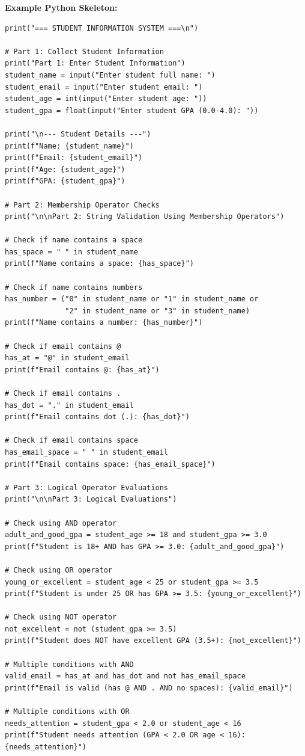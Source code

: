 \documentclass[a4paper,11pt]{article}
\theoremstyle{mytheor}
\begin{document}
    \textbf{Example Python Skeleton:}
    \begin{lstlisting}
print("=== STUDENT INFORMATION SYSTEM ===\n")

# Part 1: Collect Student Information
print("Part 1: Enter Student Information")
student_name = input("Enter student full name: ")
student_email = input("Enter student email: ")
student_age = int(input("Enter student age: "))
student_gpa = float(input("Enter student GPA (0.0-4.0): "))

print("\n--- Student Details ---")
print(f"Name: {student_name}")
print(f"Email: {student_email}")
print(f"Age: {student_age}")
print(f"GPA: {student_gpa}")

# Part 2: Membership Operator Checks
print("\n\nPart 2: String Validation Using Membership Operators")

# Check if name contains a space
has_space = " " in student_name
print(f"Name contains a space: {has_space}")

# Check if name contains numbers
has_number = ("0" in student_name or "1" in student_name or 
              "2" in student_name or "3" in student_name)
print(f"Name contains a number: {has_number}")

# Check if email contains @
has_at = "@" in student_email
print(f"Email contains @: {has_at}")

# Check if email contains .
has_dot = "." in student_email
print(f"Email contains dot (.): {has_dot}")

# Check if email contains space
has_email_space = " " in student_email
print(f"Email contains space: {has_email_space}")

# Part 3: Logical Operator Evaluations
print("\n\nPart 3: Logical Evaluations")

# Check using AND operator
adult_and_good_gpa = student_age >= 18 and student_gpa >= 3.0
print(f"Student is 18+ AND has GPA >= 3.0: {adult_and_good_gpa}")

# Check using OR operator
young_or_excellent = student_age < 25 or student_gpa >= 3.5
print(f"Student is under 25 OR has GPA >= 3.5: {young_or_excellent}")

# Check using NOT operator
not_excellent = not (student_gpa >= 3.5)
print(f"Student does NOT have excellent GPA (3.5+): {not_excellent}")

# Multiple conditions with AND
valid_email = has_at and has_dot and not has_email_space
print(f"Email is valid (has @ AND . AND no spaces): {valid_email}")

# Multiple conditions with OR
needs_attention = student_gpa < 2.0 or student_age < 16
print(f"Student needs attention (GPA < 2.0 OR age < 16): {needs_attention}")


\end{lstlisting}
\end{document}
